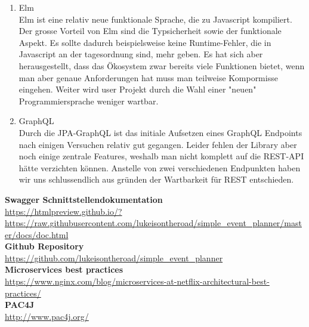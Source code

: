 \documentclass[11pt]{article} %
\begin{document}
\begin{enumerate}
\item Elm\\
Elm ist eine relativ neue funktionale Sprache, die zu Javascript kompiliert. Der grosse Vorteil von Elm sind die Typsicherheit sowie der funktionale Aspekt. Es sollte dadurch beispielsweise keine Runtime-Fehler, die in Javascript an der tagesordnung sind, mehr geben.
Es hat sich aber herausgestellt, dass das Ökosystem zwar bereits viele Funktionen bietet, wenn man aber genaue Anforderungen hat muss man teilweise Kompormisse eingehen.
Weiter wird user Projekt durch die Wahl einer "neuen" Programmiersprache weniger wartbar.
\item GraphQL\\
Durch die JPA-GraphQL ist das initiale Aufsetzen eines GraphQL Endpoints nach einigen Versuchen relativ gut gegangen. Leider fehlen der Library aber noch einige zentrale Features, weshalb man nicht komplett auf die REST-API hätte verzichten können. Anstelle von zwei verschiedenen Endpunkten haben wir uns schlussendlich aus gründen der Wartbarkeit für REST entschieden.
\end{enumerate}

\newpage
\begin{appendices}

\textbf{Swagger Schnittstellendokumentation}\\
\url{https://htmlpreview.github.io/?https://raw.githubusercontent.com/lukeisontheroad/simple_event_planner/master/docs/doc.html}\\

\textbf{Github Repository}\\
\url{https://github.com/lukeisontheroad/simple_event_planner}\\

\textbf{Microservices best practices}\\
\url{https://www.nginx.com/blog/microservices-at-netflix-architectural-best-practices/}\\

\textbf{PAC4J}\\
\url{http://www.pac4j.org/}\\



\newpage

\end{appendices}
\end{document}
